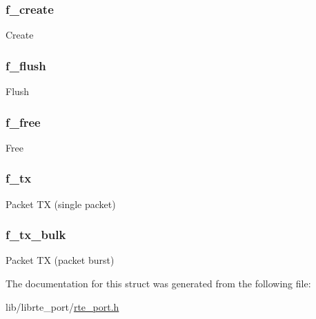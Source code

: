 \subsubsection[{f\+\_\+create}]{ f\+\_\+create}\label{structrte__port__out__ops_aafa10f331808a5965b730809de936857}
Create \hypertarget{structrte__port__out__ops_ac90ad3e84388d556a1ea7ebefd255d8a}{}
\subsubsection[{f\+\_\+flush}]{ f\+\_\+flush}\label{structrte__port__out__ops_ac90ad3e84388d556a1ea7ebefd255d8a}
Flush \hypertarget{structrte__port__out__ops_accfd44d1258a63793352fcd325cc2115}{}
\subsubsection[{f\+\_\+free}]{ f\+\_\+free}\label{structrte__port__out__ops_accfd44d1258a63793352fcd325cc2115}
Free \hypertarget{structrte__port__out__ops_a86a7c9cc97ac095acafb087b8d4f5fcb}{}
\subsubsection[{f\+\_\+tx}]{ f\+\_\+tx}\label{structrte__port__out__ops_a86a7c9cc97ac095acafb087b8d4f5fcb}
Packet T\+X (single packet) \hypertarget{structrte__port__out__ops_aec9106ca02ac43cf62b23ab8d49461a7}{}
\subsubsection[{f\+\_\+tx\+\_\+bulk}]{ f\+\_\+tx\+\_\+bulk}\label{structrte__port__out__ops_aec9106ca02ac43cf62b23ab8d49461a7}
Packet T\+X (packet burst) 

The documentation for this struct was generated from the following file\+:\begin{DoxyCompactItemize}
\item 
lib/librte\+\_\+port/\hyperlink{rte__port_8h}{rte\+\_\+port.\+h}\end{DoxyCompactItemize}
